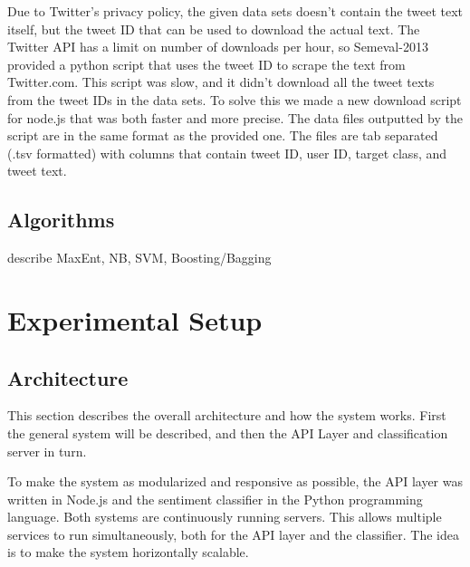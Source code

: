 Due to Twitter's privacy policy, the given data sets doesn't contain the tweet text itself, but the tweet ID that can be used to download the actual text. The Twitter API has a limit on number of downloads per hour, so Semeval-2013 provided a python script that uses the tweet ID to scrape the text from Twitter.com. This script was slow, and it didn't download all the tweet texts from the tweet IDs in the data sets. To solve this we made a new download script for node.js that was both faster and more precise. The data files outputted by the script are in the same format as the provided one. The files are tab separated (.tsv formatted) with columns that contain tweet ID, user ID, target class, and tweet text.

\section{Algorithms}

describe MaxEnt, NB, SVM, Boosting/Bagging


\chapter{Experimental Setup}
\label{sec:experimentalsetup}

\section{Architecture}

This section describes the overall architecture and how the system works. First the general system will be described, and then the API Layer and classification server in turn.  

To make the system as modularized and responsive as possible, the API layer was written in Node.js and the sentiment classifier in the Python programming language. Both systems are continuously running servers. This allows multiple services to run simultaneously, both for the API layer and the classifier. The idea is to make the system horizontally scalable.

